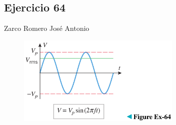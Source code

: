 \documentclass[12pt]{article}
\begin{document}
\subsection{Ejercicio 64} Zarco Romero José Antonio \\

\begin{figure}[H]
\centering
\includegraphics[width=0.7\textwidth]{../img/img_Lista4/1_64.png}
\end{figure}
\end{document}
